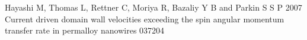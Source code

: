 \documentclass[12pt]{iopart}
\begin{document}
\begin{thebibliography}{99}
 Hayashi M, Thomas L, Rettner C, Moriya R, Bazaliy Y B and Parkin S S P 2007 Current driven domain wall velocities exceeding the spin angular momentum transfer rate in permalloy nanowires  037204






	
	
\end{thebibliography}
\end{document}
